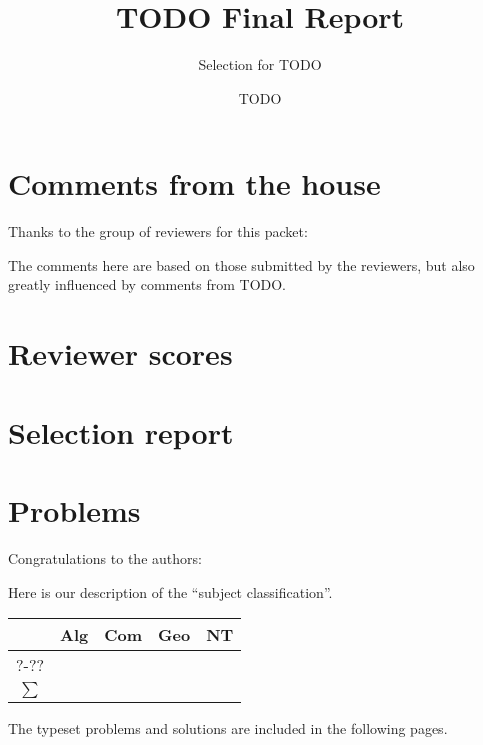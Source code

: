 \documentclass[11pt]{scrreprt}
\begin{document}
\title{TODO Final Report}
\subtitle{Selection for TODO}
\author{TODO}
\maketitle

\tableofcontents

\chapter{Comments from the house}
Thanks to the group of reviewers for this packet:



The comments here are based on those submitted by the reviewers,
but also greatly influenced by comments from TODO.



\chapter{Reviewer scores}
\setlength\tabcolsep{5pt}


\chapter{Selection report}
\chapter{Problems}
Congratulations to the authors:


Here is our description of the ``subject classification''.


\begin{center}
  \begin{tabular}[h]{c rrrr}
    \toprule
    & Alg & Com & Geo & NT \\
    \midrule
    ?-?? &      &      &      &      \\
    \midrule
    $\sum$  &      &      &      &      \\
    \bottomrule
  \end{tabular}
\end{center}

The typeset problems and solutions are included in the following pages.

% 
% 
\end{document}
